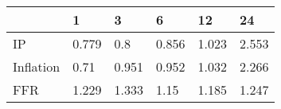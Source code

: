 \begin{tabular}{llllll}
\toprule 
& 1 & 3 & 6 & 12 & 24 \\ 
\midrule 
IP & 0.779 & 0.8 & 0.856 & 1.023 & 2.553 \\ 
Inflation & 0.71 & 0.951 & 0.952 & 1.032 & 2.266 \\ 
FFR & 1.229 & 1.333 & 1.15 & 1.185 & 1.247 \\ 
\bottomrule 
\end{tabular}